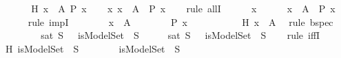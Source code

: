 \begin{isabellebody}
\ \ \isamarkupfalse%
\isanewline
{}\isamarkupfalse%
\isanewline
\ \ \isamarkupfalse%
\ H{}{\isacharcolon}\ {\isachardoublequoteopen}{\isasymforall}x\ {\isasymin}\ A{\isachardot}\ P\ x{\isachardoublequoteclose}\isanewline
\ \ \isamarkupfalse%
\ {\isachardoublequoteopen}{\isasymforall}x{\isachardot}\ {\isacharparenleft}x\ {\isasymin}\ A\ {\isasymlongrightarrow}\ P\ x{\isacharparenright}{\isachardoublequoteclose}\isanewline
\ \ \isamarkupfalse%
\ {\isacharparenleft}rule\ allI{\isacharparenright}\isanewline
\ \ \ \ \isamarkupfalse%
\ x\isanewline
\ \ \ \ \isamarkupfalse%
\ {\isachardoublequoteopen}x\ {\isasymin}\ A\ {\isasymlongrightarrow}\ P\ x{\isachardoublequoteclose}\isanewline
\ \ \ \ \isamarkupfalse%
\ {\isacharparenleft}rule\ impI{\isacharparenright}\isanewline
\ \ \ \ \ \ \isamarkupfalse%
\ {\isachardoublequoteopen}x\ {\isasymin}\ A{\isachardoublequoteclose}\isanewline
\ \ \ \ \ \ \isamarkupfalse%
\ {\isachardoublequoteopen}P\ x{\isachardoublequoteclose}\ \isanewline
\ \ \ \ \ \ \ \ \isamarkupfalse%
\ H{}\ {\isacartoucheopen}x\ {\isasymin}\ A{\isacartoucheclose}\ \isamarkupfalse%
\ {\isacharparenleft}rule\ bspec{\isacharparenright}\isanewline
\ \ \ \ \isamarkupfalse%
\isanewline
\ \ \isamarkupfalse%
\isanewline
{}\isamarkupfalse%
%
\endisatagproof
{\isafoldproof}%
%
\isadelimproof
\isanewline
%
\endisadelimproof
\isanewline
{}\isamarkupfalse%
\ {\isachardoublequoteopen}sat\ S\ {\isasymequiv}\ {\isasymexists}{\isasymA}{\isachardot}\ isModelSet\ {\isasymA}\ S{\isachardoublequoteclose}\isanewline
%
\isadelimproof
%
\endisadelimproof
%
\isatagproof
{}\isamarkupfalse%
\ {\isacharminus}\isanewline
\ \ \isamarkupfalse%
\ {\isachardoublequoteopen}sat\ S\ {\isacharequal}\ {\isacharparenleft}{\isasymexists}{\isasymA}{\isachardot}\ isModelSet\ {\isasymA}\ S{\isacharparenright}{\isachardoublequoteclose}\isanewline
\ \ \isamarkupfalse%
\ {\isacharparenleft}rule\ iffI{\isacharparenright}\isanewline
\ \ \ \ \isamarkupfalse%
\ H{}{\isacharcolon}{\isachardoublequoteopen}{\isasymexists}{\isasymA}{\isachardot}\ isModelSet\ {\isasymA}\ S{\isachardoublequoteclose}\isanewline
\ \ \ \ \isamarkupfalse%
\ {\isachardoublequoteopen}{\isasymA}{\isachardoublequoteclose}\ \ {\isachardoublequoteopen}isModelSet\ {\isasymA}\ S{\isachardoublequoteclose}\isanewline

\end{isabellebody}

